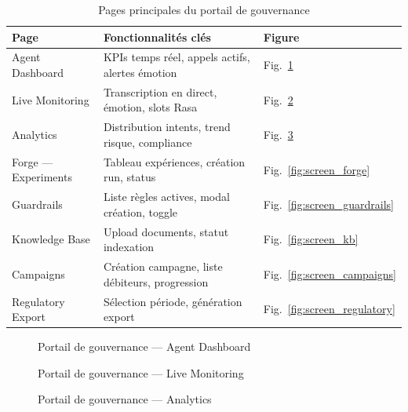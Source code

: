 \begin{table}[H]
  \centering
  \caption{Pages principales du portail de gouvernance}
  \label{tab:portail_pages}
  \begin{tabularx}{\textwidth}{lXl}
    \toprule
    \textbf{Page} & \textbf{Fonctionnalités clés} & \textbf{Figure} \\
    \midrule
    Agent Dashboard    & KPIs temps réel, appels actifs, alertes émotion & Fig.~\ref{fig:screen_dashboard} \\
    Live Monitoring    & Transcription en direct, émotion, slots Rasa     & Fig.~\ref{fig:screen_monitoring} \\
    Analytics          & Distribution intents, trend risque, compliance   & Fig.~\ref{fig:screen_analytics} \\
    Forge — Experiments & Tableau expériences, création run, status        & Fig.~\ref{fig:screen_forge} \\
    Guardrails         & Liste règles actives, modal création, toggle     & Fig.~\ref{fig:screen_guardrails} \\
    Knowledge Base     & Upload documents, statut indexation              & Fig.~\ref{fig:screen_kb} \\
    Campaigns          & Création campagne, liste débiteurs, progression  & Fig.~\ref{fig:screen_campaigns} \\
    Regulatory Export  & Sélection période, génération export             & Fig.~\ref{fig:screen_regulatory} \\
    \bottomrule
  \end{tabularx}
\end{table}


\begin{figure}[H]
  \centering
  \caption{Portail de gouvernance — Agent Dashboard}
  \label{fig:screen_dashboard}
\end{figure}

\begin{figure}[H]
  \centering
  \caption{Portail de gouvernance — Live Monitoring}
  \label{fig:screen_monitoring}
\end{figure}

\begin{figure}[H]
  \centering
  \caption{Portail de gouvernance — Analytics}
  \label{fig:screen_analytics}
\end{figure}

